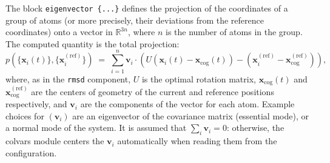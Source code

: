 The block \texttt{eigenvector~\{...\}} defines the projection of the coordinates
of a group of atoms (or more precisely, their deviations from the
reference coordinates) onto a vector in $\mathbb{R}^{3n}$, where $n$ is the
number of atoms in the group. The computed quantity is the
total projection:
\begin{equation}
  \label{eq:cvc_eigenvector}
  { p(\{\mathbf{x}_{i}(t)\},
    \{\mathbf{x}_{i}^{\mathrm{(ref)}}\}) } \; = \; {
    \sum_{i=1}^{n}  \mathbf{v}_{i} \cdot
    \left(U(\mathbf{x}_{i}(t) - \mathbf{x}_{\mathrm{cog}}(t)) -
      (\mathbf{x}_{i}^{\mathrm{(ref)}} -
      \mathbf{x}_{\mathrm{cog}}^{\mathrm{(ref)}}) \right)\mathrm{,} }
\end{equation}
where, as in the \texttt{rmsd} component, $U$ is the optimal rotation
matrix, $\mathbf{x}_{\mathrm{cog}}(t)$ and
$\mathbf{x}_{\mathrm{cog}}^{\mathrm{(ref)}}$ are the centers of
geometry of the current and reference positions respectively, and
$\mathbf{v}_{i}$ are the components of the vector for each atom.
Example choices for $(\mathbf{v}_{i})$ are an eigenvector
of the covariance matrix (essential mode), or a normal
mode of the system.  It is assumed that $\sum_{i}\mathbf{v}_{i} = 0$:
otherwise, the colvars module centers the $\mathbf{v}_{i}$
automatically when reading them from the configuration.


